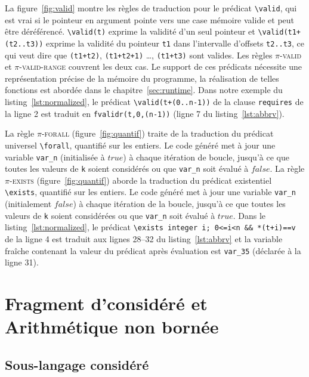 La figure~\ref{fig:valid} montre les règles de traduction pour le prédicat
\lstinline|\valid|, qui est vrai si le pointeur en argument pointe vers une
case mémoire valide et peut être déréférencé.
\lstinline'\valid(t)' exprime la validité d'un seul pointeur et
\lstinline'\valid(t1+(t2..t3))' exprime la validité du pointeur \lstinline't1'
dans l'intervalle d'offsets \lstinline't2..t3', ce qui veut dire que
\lstinline'(t1+t2)', \lstinline'(t1+t2+1)' \dots, \lstinline'(t1+t3)' sont
valides.
Les règles \textsc{$\pi$-valid} et \textsc{$\pi$-valid-range} couvrent les deux
cas.
Le support de ces prédicats nécessite une représentation précise de la mémoire
du programme, la réalisation de telles fonctions est abordée dans le
chapitre~\ref{sec:runtime}.
Dans notre exemple du listing~\ref{lst:normalized}, le prédicat
\lstinline|\valid(t+(0..n-1))| de la clause \lstinline|requires| de la ligne 2
est traduit en \lstinline[style=c]|fvalidr(t,0,(n-1))| (ligne 7 du
listing~\ref{lst:abbrv}).

La règle \textsc{$\pi$-forall} (figure~\ref{fig:quantif}) traite de la
traduction du prédicat universel \lstinline'\forall', quantifié sur les entiers.
Le code généré met à jour une variable \lstinline'var_n' (initialisée à $true$)
à chaque itération de boucle, jusqu'à ce que toutes les valeurs de \lstinline'k'
soient considérés ou que \lstinline'var_n' soit évalué à $false$.
La règle \textsc{$\pi$-exists} (figure~\ref{fig:quantif}) aborde la traduction
du prédicat existentiel \lstinline'\exists', quantifié sur les entiers.
Le code généré met à jour une variable \lstinline'var_n' (initialement $false$)
à chaque itération de la boucle, jusqu'à ce que toutes les valeurs de
\lstinline'k' soient considérées ou que \lstinline'var_n' soit évalué à $true$.
Dans le listing~\ref{lst:normalized}, le prédicat
\lstinline{\exists integer i; 0<=i<n && *(t+i)==v} de la ligne 4 est traduit
aux lignes 28--32 du listing~\ref{lst:abbrv} et la variable fraîche contenant la
valeur du prédicat après évaluation est \lstinline|var_35| (déclarée à la
ligne 31).



\section{Fragment d'\eacsl considéré et Arithmétique non bornée}
\label{sec:details}
\subsection{Sous-langage considéré}

